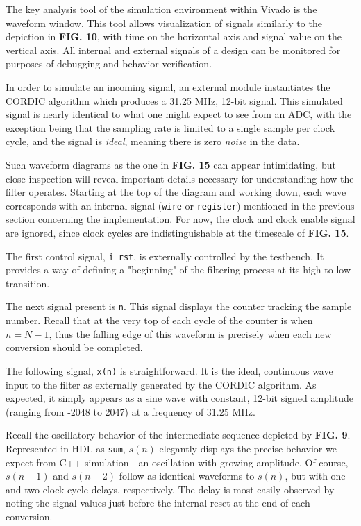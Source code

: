 \documentclass[reprint,amsmath,amssymb]{revtex4-2}
\begin{document}
The key analysis tool of the simulation environment within Vivado is the waveform window. This tool allows visualization of signals similarly to the depiction in \textbf{FIG. 10}, with time on the horizontal axis and signal value on the vertical axis. All internal and external signals of a design can be monitored for purposes of debugging and behavior verification.

In order to simulate an incoming signal, an external module instantiates the CORDIC algorithm which produces a 31.25 MHz, 12-bit signal. This simulated signal is nearly identical to what one might expect to see from an ADC, with the exception being that the sampling rate is limited to a single sample per clock cycle, and the signal is \textit{ideal}, meaning there is zero \textit{noise} in the data.

 Such waveform diagrams as the one in \textbf{FIG. 15} can appear intimidating, but close inspection will reveal important details necessary for understanding how the filter operates. Starting at the top of the diagram and working down, each wave corresponds with an internal signal (\verb+wire+ or \verb+register+) mentioned in the previous section concerning the implementation. For now, the clock and clock enable signal are ignored, since clock cycles are indistinguishable at the timescale of \textbf{FIG. 15}. 
 
 The first control signal, \verb+i_rst+, is externally controlled by the testbench. It provides a way of defining a "beginning" of the filtering process at its high-to-low transition.

 The next signal present is \verb+n+. This signal displays the counter tracking the sample number. Recall that at the very top of each cycle of the counter is when $n = N-1$, thus the falling edge of this waveform is precisely when each new conversion should be completed.

 The following signal, \verb|x(n)| is straightforward. It is the ideal, continuous wave input to the filter as externally generated by the CORDIC algorithm. As expected, it simply appears as a sine wave with constant, 12-bit signed amplitude (ranging from -2048 to 2047) at a frequency of 31.25 MHz.

 Recall the oscillatory behavior of the intermediate sequence depicted by \textbf{FIG. 9}. Represented in HDL as \verb|sum|, $s(n)$ elegantly displays the precise behavior we expect from C++ simulation---an oscillation with growing amplitude. Of course, $s(n-1)$ and $s(n-2)$ follow as identical waveforms to $s(n)$, but with one and two clock cycle delays, respectively. The delay is most easily observed by noting the signal values just before the internal reset at the end of each conversion.
\end{document}

